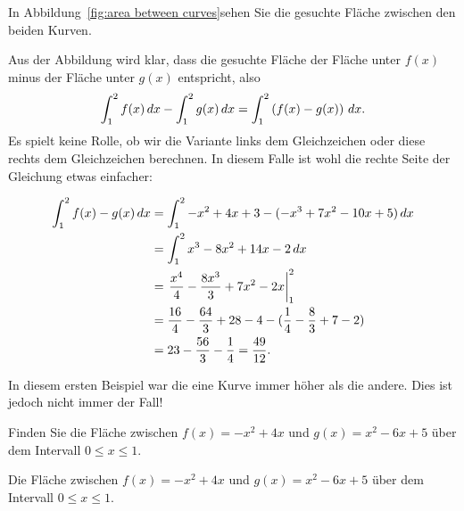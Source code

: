 \begin{solution}
In Abbildung~\ref{fig:area between curves}sehen Sie die gesuchte Fläche zwischen den beiden Kurven.

Aus der Abbildung wird klar, dass die gesuchte Fläche der Fläche unter $f(x)$ minus der Fläche unter $g(x)$ entspricht, also
\[
\int_1^2 f(x)\, d x-\int_1^2 g(x)\, d x = \int_1^2 \left(f(x)-g(x)\right)\, d x.
\]
Es spielt keine Rolle, ob wir die Variante links dem Gleichzeichen oder diese rechts dem Gleichzeichen berechnen. In diesem Falle ist wohl die rechte Seite der Gleichung etwas einfacher:

\begin{align*}
  \int_1^2 f(x)-g(x)\, d x&=\int_1^2 -x^2+4x+3-(-x^3+7x^2-10x+5)\, d x \\
  &=\int_1^2 x^3-8x^2+14x-2\, d x \\
  &=\left.{x^4\over4}-{8x^3\over3}+7x^2-2x\right|_1^2 \\
  &={16\over4}-{64\over3}+28-4-({1\over4}-{8\over3}+7-2) \\
  &=23-{56\over3}-{1\over4}={49\over12}.
\end{align*}
\end{solution}

In diesem ersten Beispiel war die eine Kurve immer höher als die andere. Dies ist jedoch nicht immer der Fall!


\begin{example} Finden Sie die Fläche zwischen $f(x)= -x^2+4x$ und
$g(x)=x^2-6x+5$ über dem Intervall $0\le x\le 1$.
\end{example}

\begin{marginfigure}
\caption{Die Fläche zwischen $f(x)= -x^2+4x$ und
$g(x)=x^2-6x+5$ über dem Intervall $0\le x\le 1$.}
\label{fig:curves cross}
\end{marginfigure}


